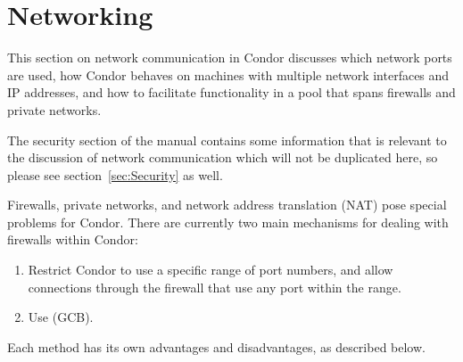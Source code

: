 \section{\label{sec:Networking}Networking}

This section on
network communication in Condor
discusses which network ports are used,
how Condor behaves on machines with multiple network interfaces
and IP addresses,
and how to facilitate functionality in a pool that spans
firewalls and private networks.

The security section of the manual contains some
information that is relevant to the discussion of network
communication which will not be duplicated here, so please
see section~\ref{sec:Security} as well.

Firewalls, private networks, and network address translation (NAT)
pose special problems for Condor.
There are currently two main mechanisms for dealing with firewalls
within Condor:

\begin{enumerate}

\item Restrict Condor to use a specific range of port numbers, and
  allow connections through the firewall that use any port within the
  range.

\item Use  (GCB).

\end{enumerate}

Each method has its own advantages and disadvantages,
as described below.













